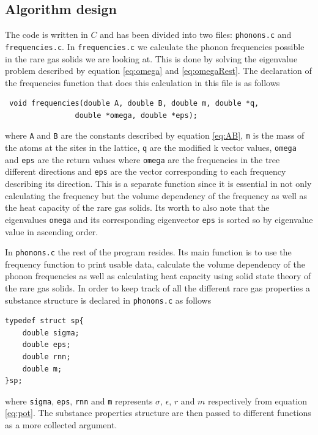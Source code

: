 \documentclass[11pt]{article}
\begin{document}
\subsection{Algorithm design}
The code is written in $C$ and has been divided into two files: \verb+phonons.c+ and \verb+frequencies.c+. In \verb+frequencies.c+ we calculate the phonon frequencies possible in the rare gas solids we are looking at. This is done by solving the eigenvalue problem described by equation \ref{eq:omega} and \ref{eq:omegaRest}. The declaration of the frequencies function that does this calculation in this file is as follows
\begin{lstlisting}
 void frequencies(double A, double B, double m, double *q, 
				double *omega, double *eps);
\end{lstlisting}
where \verb+A+ and \verb+B+ are the constants described by equation \ref{eq:AB}, \verb+m+ is the mass of the atoms at the sites in the lattice, \verb+q+ are the modified k vector values, \verb+omega+ and \verb+eps+ are the return values where \verb+omega+ are the frequencies in the tree different directions and \verb+eps+ are the vector corresponding to each frequency describing its direction. This is a separate function since it is essential in not only calculating the frequency but the volume dependency of the frequency as well as the heat capacity of the rare gas solids. Its worth to also note that the eigenvalues \verb+omega+ and its corresponding eigenvector \verb+eps+ is sorted so by eigenvalue value in ascending order.

In \verb+phonons.c+ the rest of the program resides. Its main function is to use the frequency function to print usable data, calculate the volume dependency of the phonon frequencies as well as calculating heat capacity using solid state theory of the rare gas solids. In order to keep track of all the different rare gas properties a substance structure is declared in \verb+phonons.c+ as follows
\begin{lstlisting}
typedef struct sp{
	double sigma;
	double eps;
	double rnn;
	double m;
}sp;
\end{lstlisting}
where \verb+sigma+, \verb+eps+, \verb+rnn+ and \verb+m+ represents $\sigma$, $\epsilon$, $r$ and $m$ respectively from equation \ref{eq:pot}. The substance properties structure are then passed to different functions as a more collected argument. 
\end{document}

